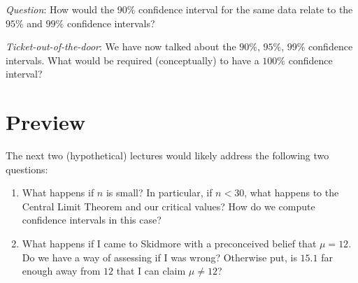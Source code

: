 \documentclass[11pt]{article}
\begin{document}
 \textit{Question}:  How would the $90\%$ confidence interval for the same data relate to the $95\%$ and $99\%$ confidence intervals?\\
  \textit{\color{blue}{Answer: More narrow.  Completely contained within each of the above.}}
 
 \textit{Ticket-out-of-the-door}: We have now talked about the $90\%$, $95\%$, $99\%$ confidence intervals.  What would be required (conceptually) to have a $100\%$ confidence interval?\\
 \textit{\color{blue}{Answer: $[0,\infty]$.  We would have our interval include all possible values for a mean number of hours spent studying.  We have now sacrificed all precision in deference to complete confidence.  If you could imagine fishing with a net that covered the entire body of water, you could be certain to come up with a fish (probably multiple), but it would say absolutely nothing about your ability as a fisherman.}}

\section{Preview} 

The next two (hypothetical) lectures would likely address the following two questions:

\begin{enumerate} 

\item What happens if $n$ is small?  In particular, if $n<30$, what happens to the Central Limit Theorem and our critical values?  How do we compute confidence intervals in this case?\\
\textit{\color{blue}{Answer: Introduction of the Studentized-T Distribution.}}
\item What happens if I came to Skidmore with a preconceived belief that $\mu = 12$.  Do we have a way of assessing if I was wrong?  Otherwise put, is $15.1$ far enough away from $12$ that I can claim $\mu \neq 12$?\\
\textit{\color{blue}{Answer: Enter hypothesis testing!}}


\end{enumerate} 
\end{document}
